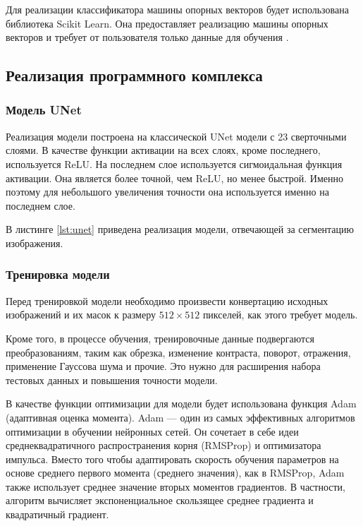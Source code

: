 Для реализации классификатора машины опорных векторов будет использована библиотека Scikit Learn. Она предоставляет реализацию машины опорных векторов и требует от пользователя только данные для обучения \cite{scikitsvm}.

\subsection{Реализация программного комплекса}

\subsubsection{Модель UNet}

Реализация модели построена на классической UNet модели с 23 сверточными слоями. В качестве функции активации на всех слоях, кроме последнего, используется ReLU. На последнем слое используется сигмоидальная функция активации. Она является более точной, чем ReLU, но менее быстрой. Именно поэтому для небольшого увеличения точности она используется именно на последнем слое.

В листинге \ref{lst:unet} приведена реализация модели, отвечающей за сегментацию изображения.



\subsubsection{Тренировка модели}

Перед тренировкой модели необходимо произвести конвертацию исходных изображений и их масок к размеру $512 \times 512$ пикселей, как этого требует модель.

Кроме того, в процессе обучения, тренировочные данные подвергаются преобразованиям, таким как обрезка, изменение контраста, поворот, отражения, применение Гауссова шума и прочие. Это нужно для расширения набора тестовых данных и повышения точности модели.

В качестве функции оптимизации для модели будет использована функция Adam (адаптивная оценка момента). Adam --- один из самых эффективных алгоритмов оптимизации в обучении нейронных сетей. Он сочетает в себе идеи среднеквадратичного распространения корня (RMSProp) и оптимизатора импульса. Вместо того чтобы адаптировать скорость обучения параметров на основе среднего первого момента (среднего значения), как в RMSProp, Adam также использует среднее значение вторых моментов градиентов. В частности, алгоритм вычисляет экспоненциальное скользящее среднее градиента и квадратичный градиент.

